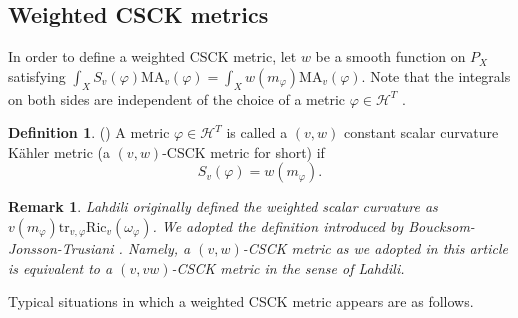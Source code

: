 \documentclass[12pt]{amsart}
\numberwithin{equation}{section}%
\theoremstyle{plain}
\newtheorem{remark}[theorem]{Remark}
\theoremstyle{definition}
\newtheorem{definition}[theorem]{Definition}
\newcommand{\tr}{\mathrm{tr}}
\newcommand{\Ric}{\mathrm{Ric}}
\newcommand{\MA}{\mathrm{MA}}
\renewcommand{\phi}{\varphi}
\newcommand{\1}{\mathbf{1}}
\begin{document}
\subsection{Weighted CSCK metrics}
In order to define a weighted CSCK metric,
let $w$ be a smooth function on $P_{X}$ satisfying
$\int_{X}S_{v}(\phi)\MA_{v}(\phi)=\int_{X}w(m_{\phi})\MA_{v}(\phi)$.
Note that the integrals on both sides are independent of the choice
of a metric $\phi\in\mathcal{H}^{T}$ \cite{Lah19}.

\begin{definition}(\cite{Lah19})
A metric $\phi\in\mathcal{H}^{T}$ is called a $(v,w)$ constant scalar curvature
K\"ahler metric (a $(v,w)$-CSCK metric for short) if
\begin{equation}
S_{v}(\phi)=w(m_{\phi}).
\end{equation}
\end{definition}

\begin{remark}\label{w-scalar}
Lahdili \cite[Section 2]{Lah19} originally defined the weighted scalar curvature as
$v(m_{\phi})\tr_{v,\phi}\Ric_{v}(\omega_{\phi})$.
We adopted the definition introduced by Boucksom-Jonsson-Trusiani
\cite[Section 3]{BJT24}.
Namely, a $(v,w)$-CSCK metric as we adopted in this article is equivalent to a $(v,vw)$-CSCK
metric in the sense of Lahdili.
\end{remark}

Typical situations in which a weighted CSCK metric appears are as follows.
\end{document}
